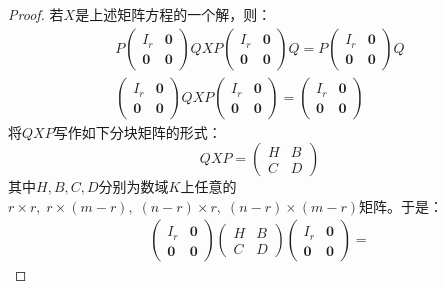 \begin{proof}
	若$X$是上述矩阵方程的一个解，则：
	\begin{gather*}
		P
		\begin{pmatrix}
			I_r & \mathbf{0} \\
			\mathbf{0} & \mathbf{0}
		\end{pmatrix}
		Q
		X
		P
		\begin{pmatrix}
			I_r & \mathbf{0} \\
			\mathbf{0} & \mathbf{0}
		\end{pmatrix}
		Q
		=
		P
		\begin{pmatrix}
			I_r & \mathbf{0} \\
			\mathbf{0} & \mathbf{0}
		\end{pmatrix}
		Q  \\
		\begin{pmatrix}
			I_r & \mathbf{0} \\
			\mathbf{0} & \mathbf{0}
		\end{pmatrix}
		Q
		X
		P
		\begin{pmatrix}
			I_r & \mathbf{0} \\
			\mathbf{0} & \mathbf{0}
		\end{pmatrix}
		=
		\begin{pmatrix}
			I_r & \mathbf{0} \\
			\mathbf{0} & \mathbf{0}
		\end{pmatrix}
	\end{gather*}
	将$QXP$写作如下分块矩阵的形式：
	\begin{equation*}
		QXP=
		\begin{pmatrix}
			H & B \\
			C & D
		\end{pmatrix}
	\end{equation*}
	其中$H,B,C,D$分别为数域$K$上任意的$r\times r,\;r\times (m-r),\;(n-r)\times r,\;(n-r)\times(m-r)$矩阵。于是：
	\begin{gather*}
		\begin{pmatrix}
			I_r & \mathbf{0} \\
			\mathbf{0} & \mathbf{0}
		\end{pmatrix}
		\begin{pmatrix}
			H & B \\
			C & D
		\end{pmatrix}
		\begin{pmatrix}
			I_r & \mathbf{0} \\
			\mathbf{0} & \mathbf{0}
		\end{pmatrix}
		=

\end{gather*}
\end{proof}
